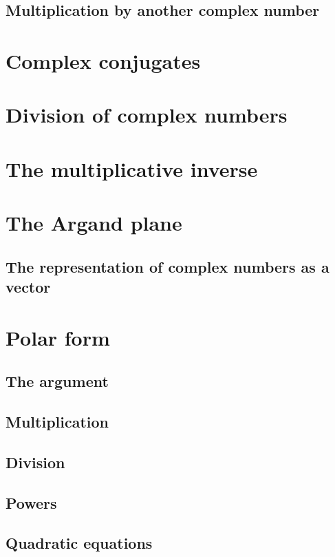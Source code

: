 \documentclass{book}
\begin{document}
\subsection{Multiplication by another complex number}

\section{Complex conjugates}

\section{Division of complex numbers}

\section{The multiplicative inverse}

\section{The Argand plane}
\subsection{The representation of complex numbers as a vector}

\section{Polar form}

\subsection{The argument}

\subsection{Multiplication}

\subsection{Division}

\subsection{Powers}

\subsection{Quadratic equations}
\end{document}
